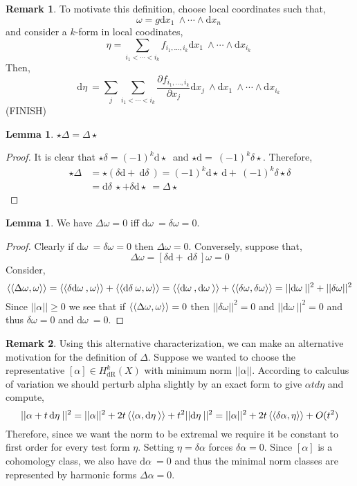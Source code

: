 \documentclass[12pt]{extarticle}
\renewcommand{\d}[1]{ \mathrm{d}#1 \:}
\newcommand{\pderiv}[2]{\frac{\partial{#1}}{\partial{#2}}}
\theoremstyle{definition}
\newtheorem{lemma}[theorem]{Lemma}
\newtheorem{remark}{Remark}
\begin{document}
\begin{remark}
To motivate this definition, choose local coordinates such that,
\[ \omega = g \d{x_1} \wedge \cdots \wedge \d{x_n} \] 
and consider a $k$-form in local coodinates,
\[ \eta = \sum_{i_1 < \cdots < i_k} f_{i_1, \dots, i_k} \d{x_1} \wedge \cdots \wedge \d{x_{i_k}} \]
Then,
\[ \d{\eta} = \sum_j \sum_{i_1 < \cdots < i_k} \pderiv{f_{i_1, \dots, i_k}}{x_j} \d{x_j} \wedge \d{x_1} \wedge \cdots \wedge \d{x_{i_k}} \]
(FINISH)
\end{remark}

\begin{lemma}
$\star \Delta = \Delta \star$
\end{lemma}

\begin{proof}
It is clear that $\star \delta = (-1)^k \d \star$ and $\star \d = (-1)^k \delta \star$. Therefore,
\begin{align*}
\star \Delta & = \star (\delta \d + \d \delta ) = (-1)^k \d \star \d + (-1)^k \delta \star \delta 
\\
& = \d  \delta \star + \delta \d \star = \Delta \star 
\end{align*} 
\end{proof}

\begin{lemma}
We have $\Delta \omega = 0$ iff $\d{\omega} = \delta{\omega} = 0$.
\end{lemma}

\begin{proof}
Clearly if $\d{\omega} = \delta{\omega} = 0$ then $\Delta \omega = 0$. Conversely, suppose that,
\[ \Delta \omega = [\delta \d + \d \delta ] \omega = 0 \]
Consider,
\[ \Inner{\Delta \omega}{\omega} = \Inner{\delta \d{\omega}}{\omega} + \Inner{\d \delta \omega}{\omega}  = \Inner{\d{\omega}}{\d{\omega}} + \Inner{\delta \omega}{\delta \omega} = ||\d{\omega} ||^2 + ||\delta \omega||^2  \]
Since $|| \alpha || \ge 0$ we see that if $\left< \left< \Delta \omega, \omega \right> \right> = 0$ then $|| \delta \omega ||^2 = 0$ and $|| \d{\omega} ||^2 = 0$ and thus $\delta \omega = 0$ and $\d{\omega} = 0$.
\end{proof}

\newcommand{\dR}{\mathrm{dR}}

\begin{remark}
Using this alternative characterization, we can make an alternative motivation for the definition of $\Delta$. Suppose we wanted to choose the representative $[\alpha] \in H^k_{\dR}(X)$ with minimum norm $|| \alpha ||$. According to calculus of variation we should perturb alpha slightly by an exact form to give $\alpha t d{\eta}$ and compute,
\[ || \alpha +  t \, \d{\eta} ||^2 = || \alpha ||^2 + 2 t \Inner{\alpha}{\d{\eta}} + t^2 || \d{\eta} ||^2 = || \alpha ||^2 + 2 t \Inner{\delta \alpha}{\eta} + O(t^2) \]
Therefore, since we want the norm to be extremal we require it be constant to first order for every test form $\eta$. Setting $\eta = \delta \alpha$ forces $\delta \alpha = 0$. Since $[\alpha]$ is a cohomology class, we also have $\d{\alpha} = 0$ and thus the minimal norm classes are represented by harmonic forms $\Delta \alpha = 0$. 
\end{remark}
\end{document}
